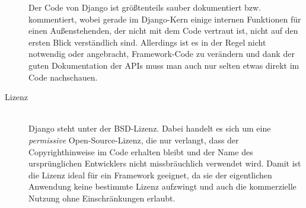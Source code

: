 \begin{description}
Der Code von Django ist größtenteils sauber dokumentiert bzw. kommentiert, wobei gerade im
Django-Kern einige internen Funktionen für einen Außenstehenden, der nicht mit dem Code vertraut
ist, nicht auf den ersten Blick verständlich sind. Allerdings ist es in der Regel nicht notwendig
oder angebracht, Framework-Code zu verändern und dank der guten Dokumentation der APIs muss man auch
nur selten etwas direkt im Code nachschauen.


\item[Lizenz] \hfill \\
Django steht unter der BSD-Lizenz. Dabei handelt es sich um eine \emph{permissive}
Open-Source-Lizenz, die nur verlangt, dass der Copyrighthinweise im Code erhalten bleibt und der
Name des ursprünglichen Entwicklers nicht missbräuchlich verwendet wird. Damit ist die Lizenz ideal
für ein Framework geeignet, da sie der eigentlichen Anwendung keine bestimmte Lizenz aufzwingt und
auch die kommerzielle Nutzung ohne Einschränkungen erlaubt.


\end{description}
